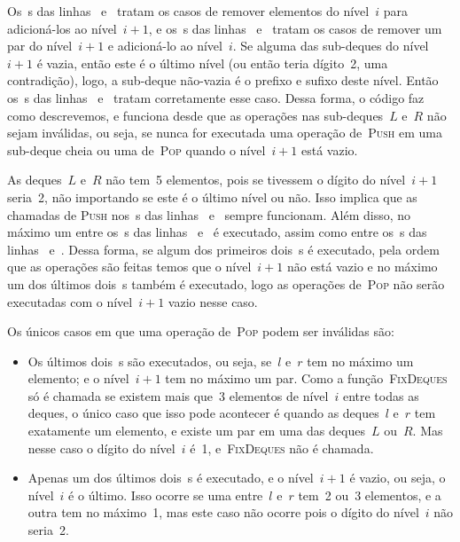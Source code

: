 \documentclass[../../main.tex]{subfiles}
\begin{document}
Os~s das linhas~ e~ tratam os casos de remover elementos do nível~$i$ para adicioná-los ao nível~$i+1$, e os~s das linhas~ e~ tratam os casos de remover um par do nível~$i+1$ e adicioná-lo ao nível~$i$. Se alguma das sub-deques do nível~$i+1$ é vazia, então este é o último nível (ou então teria dígito~2, uma contradição), logo, a sub-deque não-vazia é o prefixo e sufixo deste nível. Então os~s das linhas~ e~ tratam corretamente esse caso. Dessa forma, o código faz como descrevemos, e funciona desde que as operações nas sub-deques~$L$ e~$R$ não sejam inválidas, ou seja, se nunca for executada uma operação de~\textsc{Push} em uma sub-deque cheia ou uma de~\textsc{Pop} quando o nível~$i+1$ está vazio.

As deques~$L$ e~$R$ não tem~5 elementos, pois se tivessem o dígito do nível~$i+1$ seria~2, não importando se este é o último nível ou não. Isso implica que as chamadas de \textsc{Push} nos~s das linhas~ e~ sempre funcionam. Além disso, no máximo um entre os~s das linhas~ e~ é executado, assim como entre os~s das linhas~ e~. Dessa forma, se algum dos primeiros dois~s é executado, pela ordem que as operações são feitas temos que o nível~$i+1$ não está vazio e no máximo um dos últimos dois~s também é executado, logo as operações de~\textsc{Pop} não serão executadas com o nível~$i+1$ vazio nesse caso.

Os únicos casos em que uma operação de~\textsc{Pop} podem ser inválidas são:
\begin{itemize}
    \item Os últimos dois~s são executados, ou seja, se~$l$ e~$r$ tem no máximo um elemento; e o nível~$i+1$ tem no máximo um par. Como a função~\textsc{FixDeques} só é chamada se existem mais que~3 elementos de nível~$i$ entre todas as deques, o único caso que isso pode acontecer é quando as deques~$l$ e~$r$ tem exatamente um elemento, e existe um par em uma das deques~$L$ ou~$R$. Mas nesse caso o dígito do nível~$i$ é~1, e~\textsc{FixDeques} não é chamada.
    \item Apenas um dos últimos dois~s é executado, e o nível~$i+1$ é vazio, ou seja, o nível~$i$ é o último. Isso ocorre se uma entre~$l$ e~$r$ tem~2 ou~3 elementos, e a outra tem no máximo~1, mas este caso não ocorre pois o dígito do nível~$i$ não seria~2.
\end{itemize}
\end{document}
